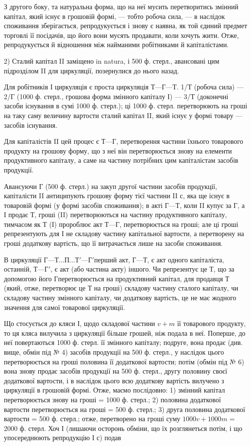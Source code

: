 З другого боку, та натуральна форма, що на неї мусить перетворитись
змінний капітал, який існує в грошовій формі, — тобто робоча сила, —
в наслідок споживання зберігається, репродукується і знову є наявна,
як той єдиний предмет торговлі її посідачів, що його вони мусять продавати,
коли хочуть жити. Отже, репродукується й відношення між найманими
робітниками й капіталістами.

2) Сталий капітал II заміщено in natura, і 500 ф. стерл., авансовані
цим підрозділом II для циркуляції, позернулися до нього назад.

Для робітників І циркуляція є проста циркуляція $Т — Г — Т$. 1/Т (робоча
сила) — 2/Г (1000 ф. стерл., грошова форма змінного капіталу І) — 3/Т
(доконечні засоби існування в сумі 1000 ф. стерл.); ці 1000 ф. стерл.
перетворюють на гроші на таку саму величину вартости сталий капітал II,
який існує у формі товару — засобів існування.

Для капіталістів II цей процес є $Т — Г$, перетворення частини їхнього
товарового продукту на грошову форму, що з неї він перетворюється
знову на елементи продуктивного капіталу, а саме на частину потрібних
цим капіталістам засобів продукції.

Авансуючи Г (500 ф. стерл.) на закуп другої частини засобів продукції,
капіталісти II антиципують грошову форму тієї частини II с, яка
ще існує в товаровій формі (у формі засобів споживання); в акті $Г — Т$,
коли II купує за Г, а І продає Т, гроші (II) перетворюються на частину
продуктивного капіталу, тимчасом як Т (І) пророблює акт $Т — Г$, перетворюється
на гроші; але ці гроші репрезентують для І не складову частину
капітальної вартости, а перетворену на гроші додаткову вартість, що її
витрачається лише на засоби споживання.

В циркуляції $Г — Т... П... Т' — Г' п$ерший акт, $Г — Т$, є акт одного капіталіста,
останній, $Т — Г'$, є акт (або частина акту) іншого. Чи репрезентує
це Т, що за допомогою його $Г п$еретворюється на продуктивний капітал,
для продавця Т (який, отже, перетворює це Т на гроші) складову частину
сталого капіталу, чи складову частину змінного капіталу, чи додаткову
вартість, це не має жодного значення для самої товарової циркуляції.

Що стосується до кляси І, щодо складової частини $v + m$ її товарового
продукту, то ця кляса вилучила з циркуляції більше грошей, ніж подала
в неї. Поперше, до неї повертаються 1000 ф. стерл. її змінного капіталу;
подруге, вона продає (див. вище, обмін під № 4) засобів продукції
на 500 ф. стерл., у наслідок цього перетворюється на гроші половина
її додаткової вартости; потім (обмін під № 6) вона знову продає засобів
продукції на 500 ф. стерл., другу половину своєї додаткової вартости,
і в наслідок цього всю додаткову вартість вилучено з циркуляції в грошовій
формі. Отже, маємо послідовно: 1) змінний капітал перетворюється
знову на гроші = 1000 ф. стерл.; 2) половина додаткової вартости перетворюється
на гроші = 500 ф. стерл.; 3) друга половина додаткової
вартости = 500 ф. стерл.; отже, перетворено на гроші суму
$1000 v + 1000 m$ = 2000 ф. стерл. Хоч І (лишаючи осторонь обміни,
що їх розглянеться потім, і що упосереднюють репродукцію І с) подав
\parbreak{}  %
